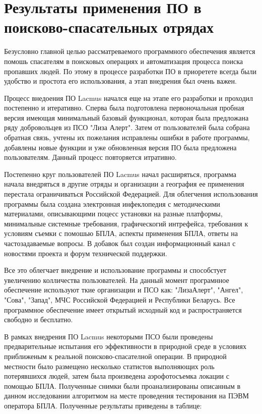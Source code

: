 \section{Результаты применения ПО в поисково-спасательных отрядах}

Безусловно главной целью рассматреваемого программного обеспечения является помошь спасателям в поисковых операциях и автоматизация процесса поиска пропавших людей. По этому в процессе разработки ПО в приоретете всегда были удобство и простота его использования, а этап внедрения был очень важен.

Процесс внедоения ПО Lacmus начался еще на этапе его разработки и проходил постепенно и итеративно. Сперва была подготовлена первоночальная пробная версия имеющая минимальный базовый функционал, которая была предложана ряду добровольцев из ПСО "Лиза Алерт". Затем от пользователей была собрана обратная связь, учтены их пожелания исправлены ошибки в работе программы, добавлены новые функции и уже обновленная версия ПО была предложена пользователям. Данный процесс повторяется итративно. 

Постепенно круг пользователей ПО Lacmus начал расширяться, программа начала внедряться в другие отряды и организации а география ее применения перестала ограничиваться Российской Федерацией. Для облегчения использования программы была создана электронная инфеклопедия с методическими материалами, описывающими поцесс установки на разные платформы, минимальные системные требования, графическогий интрефейса, требования к условиям съемки с помошью БПЛА, аспекты применения БПЛА, ответы на частозадаваемые вопросы. В добавок был создан информационный канал с новостями проекта и форум технической поддержки.

Все это облегчает внедрение и использование программы и способстует увеличению колличества пользователей. На данный момент програмнное обеспечение используют ткие организации и ПСО как: "ЛизаАлерт", "Ангел", "Сова", "Запад", МЧС Российской Федерацией и Республики Беларусь. Все программное обеспечение имеет открытый исходный код и распространяется свободно и бесплатно.

В рамках внедрения ПО Lacmus некоторыми ПСО были проведены предварительные испытания его эффективности в природной среде в условиях приближеным к реальной поисково-спасателной операции. В природной местности было размещено несколько статистов выполняющих роль потерявшихся людей, затем была произведена аэрофотосъемка локации с помощью БПЛА. Полученные снимки были проанализированы описанным в данном исследовании алгоритмом на месте проведения тестирования на ПЭВМ оператора БПЛА. Полученные результаты приведены в таблице:

